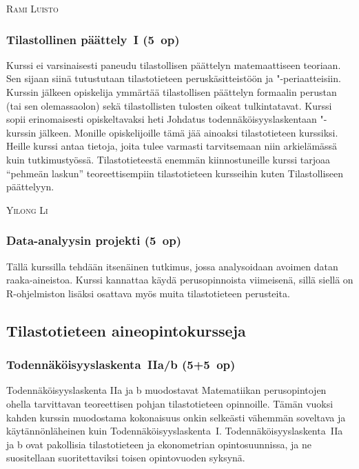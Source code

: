 \documentclass[../ala_hataile.tex]{subfiles}
\begin{document}
\vspace{0.5cm}
\noindent\textsc{Rami Luisto}

\subsubsection*{Tilastollinen päättely~I (5~op)}
Kurssi ei
varsinaisesti paneudu tilastollisen päättelyn
matemaattiseen teoriaan. Sen sijaan siinä
tutustutaan tilastotieteen peruskäsitteistöön
ja "-periaatteisiin. Kurssin jälkeen opiskelija
ymmärtää tilastollisen päättelyn formaalin
perustan (tai sen olemassaolon) sekä tilastollisten
tulosten oikeat tulkintatavat.
Kurssi sopii erinomaisesti opiskeltavaksi
heti Johdatus todennäköisyyslaskentaan
"-kurssin jälkeen. Monille opiskelijoille
tämä jää ainoaksi tilastotieteen kurssiksi.
Heille kurssi antaa tietoja, joita tulee varmasti
tarvitsemaan niin arkielämässä kuin
tutkimustyössä. Tilastotieteestä enemmän
kiinnostuneille kurssi tarjoaa ``pehmeän
laskun'' teoreettisempiin tilastotieteen
kursseihin kuten Tilastolliseen päättelyyn.

\vspace{0.5cm}
\noindent\textsc{Yilong Li}

\subsubsection*{Data-analyysin projekti (5~op)}
Tällä kurssilla tehdään itsenäinen tutkimus, jossa analysoidaan avoimen datan raaka-aineistoa. Kurssi kannattaa käydä perusopinnoista viimeisenä, sillä siellä on R-ohjelmiston lisäksi osattava myös muita tilastotieteen perusteita.

\subsection*{Tilastotieteen aineopintokursseja}
\subsubsection*{Todennäköisyyslaskenta~IIa/b (5+5~op)}
Todennäköisyyslaskenta IIa ja b muodostavat Matematiikan perusopintojen ohella tarvittavan teoreettisen pohjan tilastotieteen opinnoille. Tämän vuoksi kahden kurssin muodostama kokonaisuus onkin selkeästi vähemmän soveltava ja käytännönläheinen kuin Todennäköisyyslaskenta~I. Toden\-näköisyys\-laskenta~IIa ja b ovat pakollisia tilasto\-tieteen ja ekonometrian opinto\-suunnissa, ja ne suositellaan suoritettaviksi toisen opinto\-vuoden syksynä.
\end{document}
